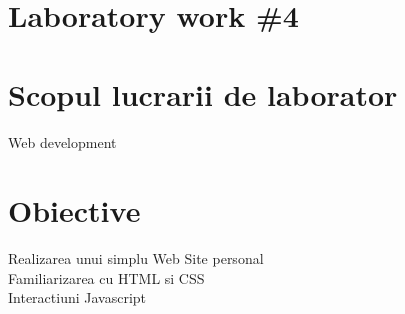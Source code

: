 \section*{Laboratory work \#4}

\section{Scopul lucrarii de laborator}
Web development
\section{Obiective}

Realizarea unui simplu Web Site personal\\

Familiarizarea cu HTML si CSS\\

Interactiuni Javascript\\

\clearpage